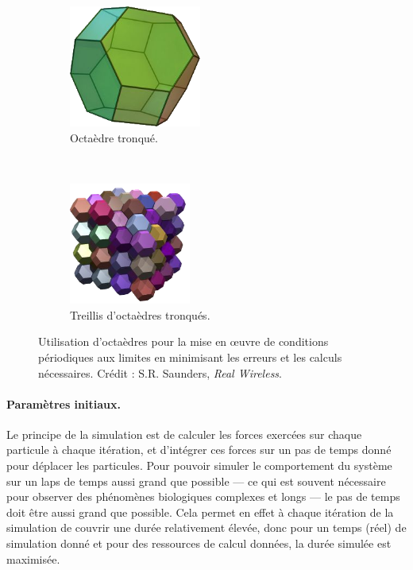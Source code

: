 	\begin{figure}[H]
		\begin{subfigure}{.5\textwidth}
			\centering
			\includegraphics[height=4cm]{./figures/ch1/truncOctahedron}
			\caption{Octaèdre tronqué.}
			\label{fig:truncOctahedron}
		\end{subfigure}
		~
		\begin{subfigure}{.5\textwidth}
			\centering
			\includegraphics[height=4cm]{./figures/ch1/truncOctahedra}
			\caption{Treillis d'octaèdres tronqués.}
			\label{fig:truncOctahedra}
		\end{subfigure}
		\caption[Octaèdres pour les conditions périodiques aux limites.]{Utilisation d'octaèdres pour la mise en œuvre de conditions périodiques aux limites en minimisant les erreurs et les calculs nécessaires. Crédit : S.R. Saunders, \emph{Real Wireless}\footnotemark.}
		\label{fig:octa}
	\end{figure}
	
	
	\paragraph{Paramètres initiaux.} Le principe de la simulation est de calculer les forces exercées sur chaque particule à chaque itération, et d'intégrer ces forces sur un pas de temps donné pour déplacer les particules. Pour pouvoir simuler le comportement du système sur un laps de temps aussi grand que possible --- ce qui est souvent nécessaire pour observer des phénomènes biologiques complexes et longs --- le pas de temps doit être aussi grand que possible. Cela permet en effet à chaque itération de la simulation de couvrir une durée relativement élevée, donc pour un temps (réel) de simulation donné et pour des ressources de calcul données, la durée simulée est maximisée.
	
